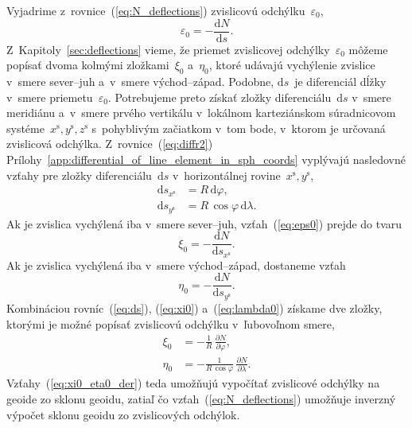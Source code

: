 \documentclass[a4paper, 12pt]{book}
\newcommand{\diff}{\mathrm d}
\begin{document}
Vyjadrime z~rovnice~(\ref{eq:N_deflections}) zvislicovú 
odchýlku~$\varepsilon_0$,
%
\begin{equation}
\label{eq:eps0}
\varepsilon_0 = -\frac{\diff N}{\diff s}{.}
\end{equation}
%
Z~Kapitoly~\ref{sec:deflections} vieme, že priemet zvislicovej 
odchýlky~$\varepsilon_0$ môžeme popísať dvoma kolmými zložkami~$\xi_0$ 
a~$\eta_0$, ktoré udávajú vychýlenie zvislice v~smere sever--juh a~v~smere 
východ--západ.  Podobne, $\diff s$~je diferenciál dĺžky v~smere 
priemetu~$\varepsilon_0$.  Potrebujeme preto získať zložky diferenciálu~$\diff 
s$ v~smere meridiánu a~v~smere prvého vertikálu v~lokálnom karteziánskom 
súradnicovom systéme~$x^\mathrm{s}, y^\mathrm{s}, z^\mathrm{s}$ s~pohyblivým 
začiatkom v~tom bode, v~ktorom je určovaná zvislicová odchýlka.  
Z~rovnice~(\ref{eq:diffr2}) 
Prílohy~\ref{app:differential_of_line_element_in_sph_coords} vyplývajú 
nasledovné vzťahy pre zložky diferenciálu~$\diff s$ v~horizontálnej 
rovine~$x^\mathrm{s}, y^\mathrm{s}$,
%
\begin{equation}
\label{eq:ds}
\begin{split}
\diff s_{x^\mathrm{s}} &= R \, \diff \varphi{,}\\
%
\diff s_{y^\mathrm{s}} &= R \, \cos\varphi \, \diff \lambda{.}
\end{split}
\end{equation}
%
Ak je zvislica vychýlená iba v~smere sever--juh, vzťah~(\ref{eq:eps0}) prejde 
do tvaru
%
\begin{equation}
\label{eq:xi0}
\xi_0 = -\frac{\diff N}{\diff s_{x^{\mathrm{s}}}}{.}
\end{equation}
%
Ak je zvislica vychýlená iba v~smere východ--západ, dostaneme vzťah
%
\begin{equation}
\label{eq:lambda0}
\eta_0 = -\frac{\diff N}{\diff s_{y^{\mathrm{s}}}}{.}
\end{equation}
%
Kombináciou rovníc~(\ref{eq:ds}), (\ref{eq:xi0}) a~(\ref{eq:lambda0}) získame 
dve zložky, ktorými je možné popísať zvislicovú odchýlku v~ľubovoľnom smere,
%
\begin{equation}
\begin{split}
\label{eq:xi0_eta0_der}
\xi_0 &= -\frac{1}{R} \, \frac{\partial N}{\partial \varphi}{,}\\
%
\eta_0 &= -\frac{1}{R \, \cos\varphi} \, \frac{\partial N}{\partial \lambda}{.}
\end{split}
\end{equation}
%
Vzťahy~(\ref{eq:xi0_eta0_der}) teda umožňujú vypočítať zvislicové odchýlky na 
geoide zo sklonu geoidu, zatiaľ čo vzťah~(\ref{eq:N_deflections}) umožňuje 
inverzný výpočet sklonu geoidu zo zvislicových odchýlok.
\end{document}
